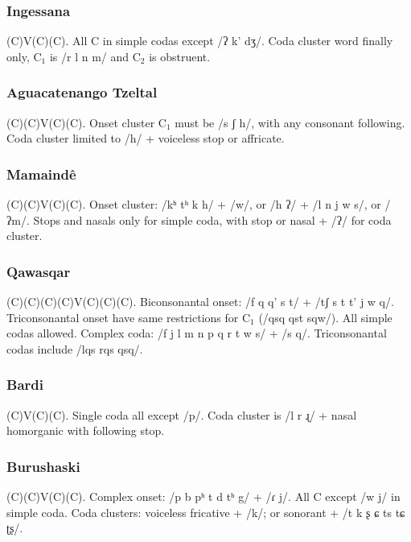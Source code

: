 \documentclass[11pt]{article}
\begin{document}
\subsubsection{Ingessana} (C)V(C)(C).  All C in simple codas except /ʔ
k' dʒ/.  Coda cluster word finally only, C$_{1}$ is /r l n m/ and
C$_{2}$ is obstruent.

\subsubsection{Aguacatenango Tzeltal} (C)(C)V(C)(C).  Onset cluster
C$_{1}$ must be /s ʃ h/, with any consonant following.  Coda cluster
limited to /h/ + voiceless stop or affricate.

\subsubsection{Mamaindê} (C)(C)V(C)(C).  Onset cluster: /kʰ tʰ k h/ +
/w/, or /h ʔ/ + /l n j w s/, or /ʔm/.  Stops and nasals only for
simple coda, with stop or nasal + /ʔ/ for coda cluster.

\subsubsection{Qawasqar} (C)(C)(C)(C)V(C)(C)(C).  Biconsonantal onset:
/f q q' s t/ + /tʃ s t t' j w q/.  Triconsonantal onset have same
restrictions for C$_1$ (/qsq qst sqw/).  All simple codas allowed.
Complex coda: /f j l m n p q r t w s/ + /s q/.  Triconsonantal codas
include /lqs rqs qsq/.

\subsubsection{Bardi} (C)V(C)(C).  Single coda all except /p/.  Coda
cluster is /l r ɻ/ + nasal homorganic with following stop.

\subsubsection{Burushaski} (C)(C)V(C)(C).  Complex onset: /p b pʰ t d
tʰ g/ + /ɾ j/.  All C except /w j/ in simple coda.  Coda clusters:
voiceless fricative + /k/; or sonorant + /t k ʂ ɕ ts tɕ ʈʂ/.  
\end{document}
